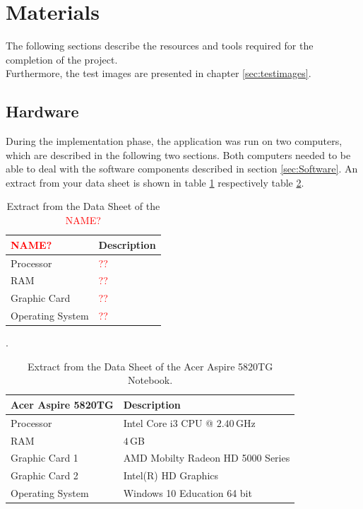\section{Materials}\label{sec:Materials}
The following sections describe the resources and tools required for the completion of the project. \\ Furthermore, the test images are presented in chapter \ref{sec:testimages}.


\subsection{Hardware}\label{sec:Hardware}
During the implementation phase, the application was run on two computers, which are described in the following two sections. Both computers needed to be able to deal with the software components described in section \ref{sec:Software}. An extract from your data sheet is shown in table \ref{tab:Computer1} respectively table \ref{tab:Computer2}.


\begin{table}
	\centering
	\begin{tabular}{|l|l|}
		\hline
		\Absatzbox{}
		\textbf{\textcolor{red}{NAME?}}& \textbf{Description} \\
		\hline
		Processor & \textcolor{red}{??} \\
		\hline
		RAM & \textcolor{red}{??}  \\
 		\hline 
		Graphic Card & \textcolor{red}{??} \\
		\hline
		Operating System & \textcolor{red}{??}  \\
		\hline
	\end{tabular}
	\caption[Extract from the Data Sheet of the \textcolor{red}{NAME?}]{Extract from the Data Sheet of the \textcolor{red}{NAME?}}.
	\label{tab:Computer1}
\end{table}

\begin{table}
	\centering
	\begin{tabular}{|l|l|}
		\hline
		\Absatzbox{}
		\textbf{Acer Aspire 5820TG}& \textbf{Description} \\
		\hline
		Processor & Intel Core i3 CPU @ $2.40\,$GHz \\
		\hline
		RAM & $4\,$GB \\
 		\hline 
		Graphic Card 1 & AMD Mobilty Radeon HD 5000 Series\\
		\hline
		Graphic Card 2 & Intel(R) HD Graphics\\
		\hline
		Operating System & Windows 10 Education 64 bit \\
		\hline
	\end{tabular}
	\caption[Extract from the Data Sheet of the Acer Aspire 5820TG Notebook.]{Extract from the Data Sheet of the Acer Aspire 5820TG Notebook.}
	\label{tab:Computer2}
\end{table}


